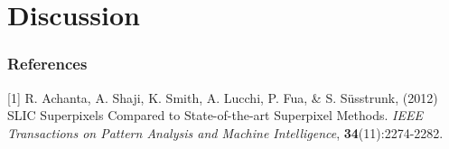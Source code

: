 \documentclass{article} %
\begin{document}
\section{Discussion}

\subsubsection*{References}

% 
% 
\small{
[1] R. Achanta, A. Shaji, K. Smith, A. Lucchi, P. Fua, \& S. Süsstrunk, (2012) SLIC Superpixels Compared to State-of-the-art Superpixel Methods. {\it IEEE Transactions on Pattern Analysis and Machine Intelligence}, {\bf 34}(11):2274-2282.

}
\end{document}
